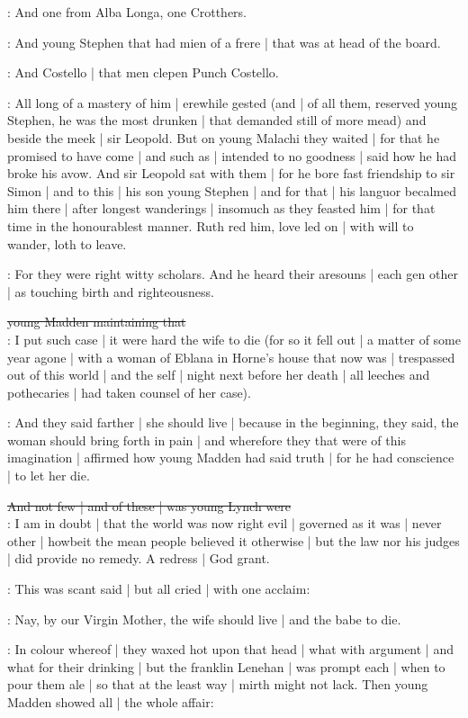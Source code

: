 :
And one from Alba Longa,
one Crotthers.

:
And young Stephen
that had mien of a frere |
that was at head of the board.

:
And Costello |
that men clepen Punch Costello.

:
All long of a mastery of him |
erewhile gested
(and |
of all them,
reserved young Stephen,
he was the most drunken |
that demanded still of more mead)
and beside the meek |
sir Leopold.
But on young Malachi they waited |
for that he promised to have come |
and such as |
intended to no goodness |
said how he had broke his avow.
And sir Leopold sat with them |
for he bore fast friendship to sir Simon |
and to this |
his son young Stephen |
and for that |
his languor becalmed him there |
after longest wanderings |
insomuch as they feasted him |
for that time in the honourablest manner.
Ruth red him,
love led on |
with will to wander,
loth to leave.


:
For they were right witty scholars.
And he heard their aresouns |
each gen other |
as touching birth and righteousness.

\sout{young Madden maintaining that}\\
\madden:
I put such case |
it were hard the wife to die
(for so it fell out |
a matter of some year agone |
with a woman of Eblana in Horne's house that now was |
trespassed out of this world |
and the self |
night next before her death |
all leeches and pothecaries |
had taken counsel of her case).

:
And they said farther |
she should live |
because in the beginning,
they said,
the woman should bring forth in pain |
and wherefore they that were of this imagination |
affirmed how young Madden had said truth |
for he had conscience |
to let her die.

\sout{And not few |
and of these |
was young Lynch were}\\
\lynch:
I am in doubt |
that the world was now right evil |
governed as it was |
never other |
howbeit the mean people believed it otherwise |
but the law nor his judges |
did provide no remedy.
A redress |
God grant.

:
This was scant said |
but all cried |
with one acclaim:

\All:
Nay,
by our Virgin Mother,
the wife should live |
and the babe to die.

:
In colour whereof |
they waxed hot upon that head |
what with argument |
and what for their drinking |
but the franklin Lenehan |
was prompt each |
when to pour them ale |
so that at the least way |
mirth might not lack.
Then young Madden showed all |
the whole affair:

